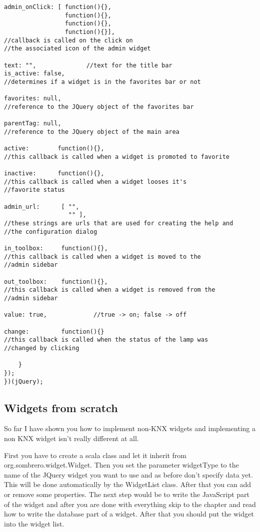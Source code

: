 \begin{lstlisting}[caption=binaray widget: ui.binary.js ,label=lst:h2h:binarywidget]
admin_onClick: [ function(){},	
                 function(){},		
                 function(){},
                 function(){}],
//callback is called on the click on
//the associated icon of the admin widget

text: "",              //text for the title bar
is_active: false,
//determines if a widget is in the favorites bar or not

favorites: null,
//reference to the JQuery object of the favorites bar

parentTag: null,
//reference to the JQuery object of the main area

active: 	   function(){},
//this callback is called when a widget is promoted to favorite

inactive: 	   function(){},
//this callback is called when a widget looses it's
//favorite status

admin_url: 		[ "",
           		  "" ],
//these strings are urls that are used for creating the help and
//the configuration dialog

in_toolbox:		function(){},
//this callback is called when a widget is moved to the
//admin sidebar

out_toolbox:	function(){},
//this callback is called when a widget is removed from the
//admin sidebar

value: true,		     //true -> on; false -> off

change:			function(){}
//this callback is called when the status of the lamp was
//changed by clicking

	}
});
})(jQuery);

\end{lstlisting}

\subsection{Widgets from scratch}
So far I have shown you how to implement non-KNX widgets and implementing a non KNX widget isn't really different at all.

First you have to create a scala class and let it inherit from org.sombrero.widget.Widget. Then you set the parameter widgetType to the name of the JQuery widget you want to use and as before don't specify data yet. This will be done automatically by the WidgetList class. After that you can add or remove some properties. The next step would be to write the JavaScript part of the widget and after you are done with everything skip to the chapter and read how to write the database part of a widget. After that you should put the widget into the widget list.

